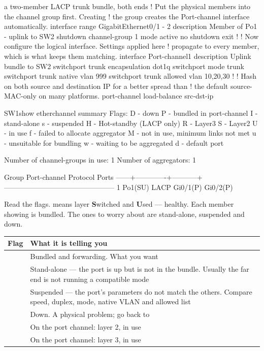\begin{config}{a two-member LACP trunk bundle, both ends}
! Put the physical members into the channel group first. Creating
! the group creates the Port-channel interface automatically.
interface range GigabitEthernet0/1 - 2
 description Member of Po1 - uplink to SW2
 shutdown
 channel-group 1 mode active
 no shutdown
exit
!
! Now configure the logical interface. Settings applied here
! propagate to every member, which is what keeps them matching.
interface Port-channel1
 description Uplink bundle to SW2
 switchport trunk encapsulation dot1q
 switchport mode trunk
 switchport trunk native vlan 999
 switchport trunk allowed vlan 10,20,30
!
! Hash on both source and destination IP for a better spread than
! the default source-MAC-only on many platforms.
port-channel load-balance src-dst-ip
\end{config}

\begin{verify}{SW1}{show etherchannel summary}
Flags:  D - down        P - bundled in port-channel
        I - stand-alone s - suspended
        H - Hot-standby (LACP only)
        R - Layer3      S - Layer2
        U - in use      f - failed to allocate aggregator
        M - not in use, minimum links not met
        u - unsuitable for bundling
        w - waiting to be aggregated
        d - default port

Number of channel-groups in use: 1
Number of aggregators:           1

Group  Port-channel  Protocol    Ports
------+-------------+-----------+-----------------------------------------------
1      Po1(SU)         LACP      Gi0/1(P)    Gi0/2(P)
\end{verify}

Read the flags.  means layer \textbf{S}witched and \textbf{U}sed ---
healthy. Each member showing  is bundled. The ones to worry about are
 stand-alone,  suspended and  down.

\begin{longtable}{@{}C{2.0cm}L{13.2cm}@{}}
\toprule
{}
\textbf{Flag} & \textbf{What it is telling you} \\
\midrule
\endhead
{} & Bundled and forwarding. What you want \\
 & Stand-alone --- the port is up but is not in the bundle. Usually the
far end is not running a compatible mode \\
 & Suspended --- the port's parameters do not match the others. Compare
speed, duplex, mode, native VLAN and allowed list \\
 & Down. A physical problem; go back to  \\
 & On the port channel: layer 2, in use \\
 & On the port channel: layer 3, in use \\
\bottomrule
\end{longtable}

